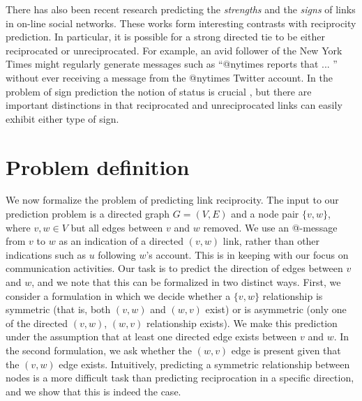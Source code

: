 \documentclass[conference]{IEEEtran}
\begin{document}
There has also been recent research predicting the 
{\em strengths} \cite{gilbert-tie-strength} and the 
{\em signs} \cite{leskovec-chi10} of links in on-line social networks.
These works form interesting contrasts with reciprocity prediction.
In particular, it is possible for a strong directed tie to be
either reciprocated or unreciprocated.  For example, an avid
follower of the New York Times might regularly generate messages
such as ``@nytimes reports that ... '' without
ever receiving a message from the @nytimes Twitter account.
In the problem of sign prediction the
notion of status is crucial \cite{leskovec-chi10},
but there are important distinctions in that reciprocated and
unreciprocated links can easily exhibit either type of sign.

\section{Problem definition}

We now formalize the problem of predicting link reciprocity.
The input to our prediction problem is a directed graph $G=(V,E)$ and a node pair $\{v,w\}$, where $v,w \in V$ but all edges between $v$ and $w$ removed. 
We use an @-message from $v$ to $w$ as an indication of a directed
$(v,w)$ link, rather than other indications such as $u$ following $w$'s account.
This is in keeping with our focus 
on communication activities.
Our task is to predict the direction of edges between $v$ and $w$, and we note
that this can be formalized in two distinct ways.
First, we consider a formulation in which we decide whether a $\{v,w\}$ relationship is symmetric (that is, both $(v,w)$ and $(w,v)$ exist) or is asymmetric (only one of the directed $(v,w)$, $(w,v)$ relationship exists).
We make this prediction under the assumption that at least one directed edge exists between $v$ and $w$. 
In the second formulation, we ask whether the $(w,v)$ edge is present given that the 
$(v,w)$ edge exists.
Intuitively, predicting a symmetric relationship
between nodes is a more difficult task than predicting reciprocation
in a specific direction, and we show that this is indeed the case.
\end{document}
